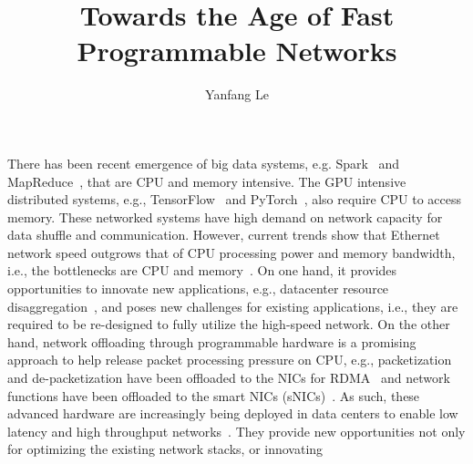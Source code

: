 \documentclass[10pt]{article}
\title{Towards the Age of Fast Programmable Networks}
\author{Yanfang Le}
\date{}
\begin{document}
\maketitle
\vspace{-5mm}
There has been recent emergence of big data systems, e.g. Spark~\cite{spark} and MapReduce~\cite{Dean:2004:MSD}, that are CPU and memory intensive. The GPU intensive distributed systems, e.g., TensorFlow~\cite{Abadi:2016:TSL} and PyTorch~\cite{pytorch}, also require CPU to access memory. 
These networked systems have high demand on network capacity for data shuffle and communication. 
However, current trends show that Ethernet network speed outgrows that of CPU processing power and memory bandwidth, 
i.e., the bottlenecks are CPU and memory~\cite{CPU:bandwidth,DRAM:scaling}. 
On one hand, it provides opportunities to innovate new applications, e.g., datacenter resource disaggregation~\cite{aggregation:gao}, and poses new challenges for existing applications, i.e., they are required to be re-designed to fully utilize the high-speed network. On the other hand, network offloading through programmable hardware is a 
promising approach to help release packet processing pressure on CPU, e.g., packetization and de-packetization have been offloaded to the NICs for RDMA~\cite{rocev2} and network functions have been offloaded to the smart NICs (sNICs)~\cite{uno:le}.
As such, these advanced hardware are increasingly being deployed in data centers %
to enable low latency and high throughput networks~\cite{Guo:2016:ROC, Firestone:2018:AAN, catapult, brainwave}.
They provide new opportunities not only for optimizing the existing network stacks, or innovating 
\end{document}
